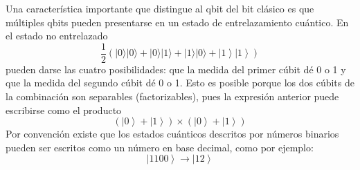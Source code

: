 Una característica importante que distingue al qbit del bit clásico es que múltiples qbits pueden presentarse en un estado de entrelazamiento cuántico. En el estado no entrelazado
\begin{equation*}
    \frac {1}{2}\left(|0\rangle |0\rangle +|0\rangle |1\rangle +|1\rangle |0\rangle +\left|1\right\rangle \left|1\right\rangle \right)
\end{equation*}
pueden darse las cuatro posibilidades: que la medida del primer cúbit dé 0 o 1 y que la medida del segundo cúbit dé 0 o 1. Esto es posible porque los dos cúbits de la combinación son separables (factorizables), pues la expresión anterior puede escribirse como el producto
\begin{equation*}
    \left(\left|0\right\rangle +\left|1\right\rangle \right)\times \left(\left|0\right\rangle +\left|1\right\rangle \right)
\end{equation*}
Por convención existe que los estados cuánticos descritos por números binarios pueden ser escritos como un número en base decimal, como por ejemplo:
\begin{equation*}
    \left| 1100\right\rangle \rightarrow \left|12 \right\rangle
\end{equation*}